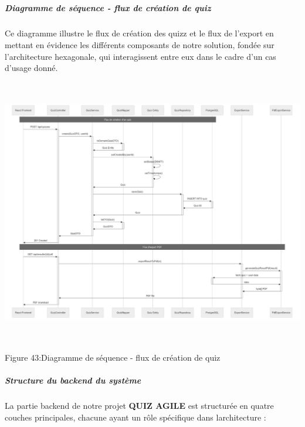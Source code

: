 \documentclass[12pt,a4paper,twoside]{report}
\begin{document}
\hypertarget{section-6}{%
\subparagraph{}\label{section-6}}

\hypertarget{diagramme-de-suxe9quence---flux-de-cruxe9ation-de-quiz}{%
\subparagraph{\texorpdfstring{Diagramme de séquence - flux de création
de quiz
}{Diagramme de séquence - flux de création de quiz }}\label{diagramme-de-suxe9quence---flux-de-cruxe9ation-de-quiz}}

Ce diagramme illustre le flux de création des quizz et le flux de
l'export en mettant en évidence les différents composants de notre
solution, fondée sur l'architecture hexagonale, qui interagissent entre
eux dans le cadre d'un cas d'usage donné.

\includegraphics[width=6.3in,height=4.60318in]{latex_media/media/image49.png}

\protect\hypertarget{_Toc203823453}{}{}Figure 43:Diagramme de séquence -
flux de création de quiz

\hypertarget{structure-du-backend-du-systuxe8me}{%
\subparagraph{Structure du backend du
système}\label{structure-du-backend-du-systuxe8me}}

La partie backend de notre projet \textbf{QUIZ AGILE} est structurée en
quatre couches principales, chacune ayant un rôle spécifique dans
l\textquotesingle architecture :
\end{document}
